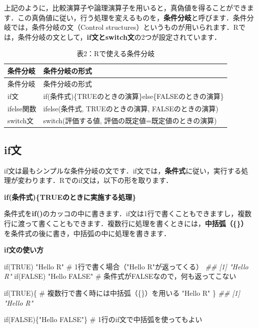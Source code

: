 \documentclass[
  letterpaper,
  DIV=11,
  numbers=noendperiod]{scrreprt}
\newenvironment{Shaded}{\begin{snugshade}}{\end{snugshade}}
\newcommand{\CommentTok}[1]{\textcolor[rgb]{0.37,0.37,0.37}{#1}}
\newcommand{\ConstantTok}[1]{\textcolor[rgb]{0.56,0.35,0.01}{#1}}
\newcommand{\ControlFlowTok}[1]{\textcolor[rgb]{0.00,0.23,0.31}{#1}}
\newcommand{\DocumentationTok}[1]{\textcolor[rgb]{0.37,0.37,0.37}{\textit{#1}}}
\newcommand{\NormalTok}[1]{\textcolor[rgb]{0.00,0.23,0.31}{#1}}
\newcommand{\StringTok}[1]{\textcolor[rgb]{0.13,0.47,0.30}{#1}}
\begin{document}
上記のように，比較演算子や論理演算子を用いると，真偽値を得ることができます．この真偽値に従い，行う処理を変えるものを，\textbf{条件分岐}と呼びます．条件分岐では，条件分岐の文（Control
structures）というものが用いられます．Rでは，条件分岐の文として，\textbf{if文とswitch文}の2つが設定されています．

\begin{longtable}[]{@{}ll@{}}
\caption{表2：Rで使える条件分岐}\tabularnewline
\toprule()
条件分岐 & 条件分岐の形式 \\
\midrule()
\endfirsthead
\toprule()
条件分岐 & 条件分岐の形式 \\
\midrule()
\endhead
if文 & if(条件式)\{TRUEのときの演算\}else\{FALSEのときの演算\} \\
ifelse関数 & ifelse(条件式, TRUEのときの演算, FALSEのときの演算) \\
switch文 & switch(評価する値, 評価の既定値=既定値のときの演算) \\
\bottomrule()
\end{longtable}

\hypertarget{ifux6587}{%
\subsection{if文}\label{ifux6587}}

if文は最もシンプルな条件分岐の文です．if文では，\textbf{条件式}に従い，実行する処理が変わります．Rでのif文は，以下の形を取ります．

\textbf{if(条件式)\{TRUEのときに実施する処理\}}

条件式を\textbf{if()}のカッコの中に書きます．if文は1行で書くこともできますし，複数行に渡って書くこともできます．複数行に処理を書くときには，\textbf{中括弧（\{\}）}を条件式の後に書き，中括弧の中に処理を書きます．

\textbf{if文の使い方}

\begin{Shaded}
\begin{Highlighting}[]
\ControlFlowTok{if}\NormalTok{(}\ConstantTok{TRUE}\NormalTok{) }\StringTok{"Hello R"} \CommentTok{\# 1行で書く場合（"Hello R"が返ってくる）}
\DocumentationTok{\#\# [1] "Hello R"}
\ControlFlowTok{if}\NormalTok{(}\ConstantTok{FALSE}\NormalTok{) }\StringTok{"Hello FALSE"} \CommentTok{\# 条件式がFALSEなので，何も返ってこない}

\ControlFlowTok{if}\NormalTok{(}\ConstantTok{TRUE}\NormalTok{)\{ }\CommentTok{\# 複数行で書く時には中括弧（\{\}）を用いる}
  \StringTok{"Hello R"}
\NormalTok{\}}
\DocumentationTok{\#\# [1] "Hello R"}

\ControlFlowTok{if}\NormalTok{(}\ConstantTok{FALSE}\NormalTok{)\{}\StringTok{"Hello FALSE"}\NormalTok{\} }\CommentTok{\# 1行のif文で中括弧を使ってもよい}
\end{Highlighting}
\end{Shaded}
\end{document}
